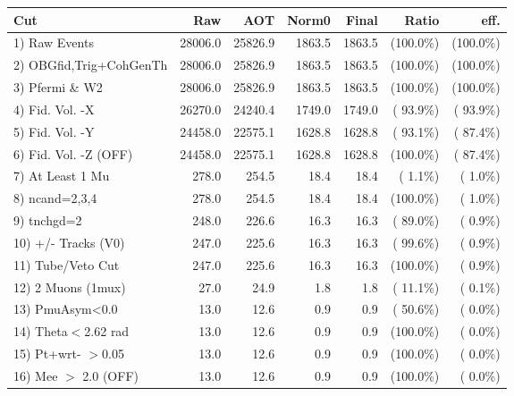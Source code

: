 \begin{table}[h!]\centering
 \begin{tabular}{||l||r|r|r|r|r|r||}
 \hline
 \hline
 Cut & Raw & AOT & Norm0 & Final & Ratio & eff.       \\
 \hline
  1) Raw Events           &      28006.0 &      25826.9 &       1863.5 &       1863.5 & (100.0\%) & (100.0\%) \\
  2) OBGfid,Trig+CohGenTh &      28006.0 &      25826.9 &       1863.5 &       1863.5 & (100.0\%) & (100.0\%) \\
  3) Pfermi \& W2         &      28006.0 &      25826.9 &       1863.5 &       1863.5 & (100.0\%) & (100.0\%) \\
  4) Fid. Vol. -X         &      26270.0 &      24240.4 &       1749.0 &       1749.0 & ( 93.9\%) & ( 93.9\%) \\
  5) Fid. Vol. -Y         &      24458.0 &      22575.1 &       1628.8 &       1628.8 & ( 93.1\%) & ( 87.4\%) \\
  6) Fid. Vol. -Z (OFF)   &      24458.0 &      22575.1 &       1628.8 &       1628.8 & (100.0\%) & ( 87.4\%) \\
  7) At Least 1 Mu        &        278.0 &        254.5 &         18.4 &         18.4 & (  1.1\%) & (  1.0\%) \\
  8) ncand=2,3,4          &        278.0 &        254.5 &         18.4 &         18.4 & (100.0\%) & (  1.0\%) \\
  9) tnchgd=2             &        248.0 &        226.6 &         16.3 &         16.3 & ( 89.0\%) & (  0.9\%) \\
 10) +/- Tracks (V0)      &        247.0 &        225.6 &         16.3 &         16.3 & ( 99.6\%) & (  0.9\%) \\
 11) Tube/Veto Cut        &        247.0 &        225.6 &         16.3 &         16.3 & (100.0\%) & (  0.9\%) \\
 12) 2 Muons (1mux)       &         27.0 &         24.9 &          1.8 &          1.8 & ( 11.1\%) & (  0.1\%) \\
 13) PmuAsym<0.0          &         13.0 &         12.6 &          0.9 &          0.9 & ( 50.6\%) & (  0.0\%) \\
 14) Theta$<$2.62 rad     &         13.0 &         12.6 &          0.9 &          0.9 & (100.0\%) & (  0.0\%) \\
 15) Pt+wrt- $>$0.05      &         13.0 &         12.6 &          0.9 &          0.9 & (100.0\%) & (  0.0\%) \\
 16) Mee $>$ 2.0  (OFF)   &         13.0 &         12.6 &          0.9 &          0.9 & (100.0\%) & (  0.0\%) \\

\end{tabular}
\end{table}
